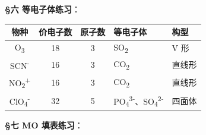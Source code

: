 \documentclass[a4paper,11pt]{ctexart}
\newcounter{none}
\newcommand{\箭}{\ensuremath{\rightarrow}}
\newcommand{\左箭}{\ensuremath{\leftarrow}}
\newcommand{\上箭}{\ensuremath{\uparrow}}
\newcommand{\下箭}{\ensuremath{\downarrow}}
\newcommand{\衡}{\ensuremath{\rightleftharpoons}}
\newcommand{\双箭}{\ensuremath{\leftrightarrow}}
\newcommand{\约等于}{\ensuremath{\approx}}
\newcommand{\小于等于}{\ensuremath{\leq}}
\newcommand{\大于等于}{\ensuremath{\geq}}
\newcommand{\不等于}{\ensuremath{\neq}}
\newcommand{\西格马}{\ensuremath{\sigma}}
\newcommand{\派}{\ensuremath{\pi}}
\begin{document}
\textbf{§六 等电子体练习}：

{\def\LTcaptype{none} %
\begin{longtable}[]{@{}cccll@{}}
\toprule\noalign{}
物种 & 价电子数 & 原子数 & 等电子体 & 构型 \\
\midrule\noalign{}
\endhead
\bottomrule\noalign{}
\endlastfoot
O\textsubscript{3} & 18 & 3 & SO\textsubscript{2} & V 形 \\
SCN\textsuperscript{-} & 16 & 3 & CO\textsubscript{2} & 直线形 \\
NO\textsubscript{2}\textsuperscript{+} & 16 & 3 & CO\textsubscript{2} & 直线形 \\
ClO\textsubscript{4}\textsuperscript{-} & 32 & 5 & PO\textsubscript{4}\textsuperscript{3-}、SO\textsubscript{4}\textsuperscript{2-} & 四面体 \\
\end{longtable}
}

\textbf{§七 MO 填表练习}：
\end{document}
